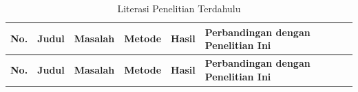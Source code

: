 \begingroup
\setlength{\tabcolsep}{3.5pt}
\renewcommand{\arraystretch}{1.25}
\footnotesize

\begin{longtable}{|p{}|p{}|p{}|p{}|p{}|p{}|}
	\caption{Literasi Penelitian Terdahulu}
	\label{table:2.literasi}\\
	\hline
	\textbf{No.} & \textbf{Judul} & \textbf{Masalah} & \textbf{Metode} & \textbf{Hasil} & \textbf{Perbandingan dengan Penelitian Ini} \\
	\hline
	\endfirsthead

	\hline
	\textbf{No.} & \textbf{Judul} & \textbf{Masalah} & \textbf{Metode} & \textbf{Hasil} & \textbf{Perbandingan dengan Penelitian Ini} \\
	\hline
	\endhead


\end{longtable}
